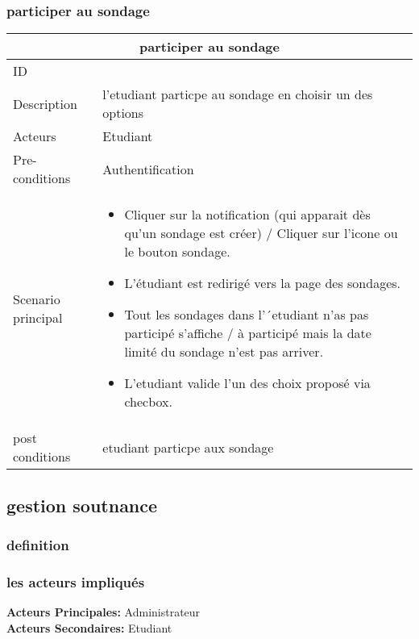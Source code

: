 \documentclass[11pt,fleqn]{book} %
\begin{document}
\subsubsection{participer au sondage}
\begin{center}
\begin{tabularx}{1\textwidth} { | p{4cm} | >{\raggedright\arraybackslash}X |  }
  \hline
  \multicolumn{2}{|c|}{participer au sondage} \\
 \hline
 ID & 3  \\
 \hline
 Description  & l'etudiant particpe au sondage en choisir un des options   \\
  \hline
 Acteurs  & Etudiant   \\
  \hline
 Pre-conditions  & Authentification\\
 \hline
 Scenario principal  &  
 \begin{itemize}
     \item  Cliquer sur la notification (qui apparait dès qu’un sondage est créer) / Cliquer sur l’icone ou le bouton sondage.
     \item L’étudiant est redirigé vers la page des sondages.
     \item Tout les sondages dans l’´etudiant n’as pas participé s’affiche / à participé mais la date limité du sondage n’est pas arriver.
     \item L’etudiant valide l’un des choix proposé via checbox.

 \end{itemize}\\
  \hline
 post conditions  & etudiant particpe aux sondage \\
  \hline
\end{tabularx}
\label{tbl:nicetablelesstable}
\end{center}

\subsection{gestion soutnance} 

\subsubsection{definition}
\subsubsection{les acteurs impliqués}
\textbf{Acteurs Principales:} Administrateur\\
\textbf{Acteurs Secondaires:} Etudiant
\end{document}
